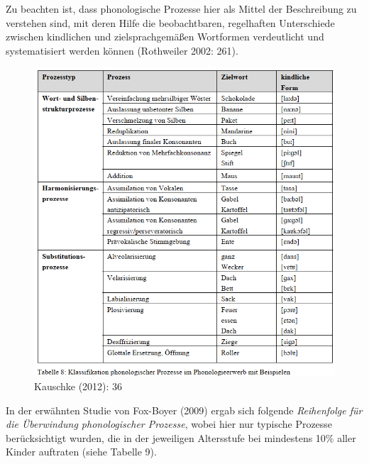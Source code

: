 \documentclass[
  letterpaper,
]{scrbook}
\begin{document}
Zu beachten ist, dass phonologische Prozesse hier als Mittel der
Beschreibung zu verstehen sind, mit deren Hilfe die beobachtbaren,
regelhaften Unterschiede zwischen kindlichen und zielsprachgemäßen
Wortformen verdeutlicht und systematisiert werden können (Rothweiler
2002: 261).

\begin{figure}

{\centering \includegraphics[width=1\textwidth,height=\textheight]{./pictures/L1_Entwicklung_kauschke_Tab8.png}

}

\caption{Kauschke (2012): 36}

\end{figure}

In der erwähnten Studie von Fox-Boyer (2009) ergab sich folgende
\emph{Reihenfolge für die Überwindung phonologischer Prozesse}, wobei
hier nur typische Prozesse berücksichtigt wurden, die in der jeweiligen
Altersstufe bei mindestens 10\% aller Kinder auftraten (siehe Tabelle
9).
\end{document}
